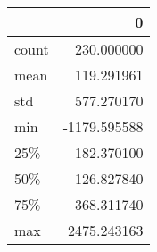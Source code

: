 \begin{tabular}{lr}
\toprule
{} &            0 \\
\midrule
count &   230.000000 \\
mean  &   119.291961 \\
std   &   577.270170 \\
min   & -1179.595588 \\
25\%   &  -182.370100 \\
50\%   &   126.827840 \\
75\%   &   368.311740 \\
max   &  2475.243163 \\
\bottomrule
\end{tabular}

